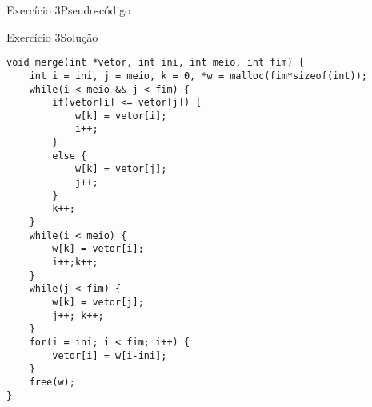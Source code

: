 \documentclass[aspectratio=169]{beamer}
\begin{document}
\begin{frame}{Exercício 3}{Pseudo-código}
\end{frame}


\begin{frame}[fragile]{Exercício 3}{Solução}
\begin{lstlisting}[style=CStyle,basicstyle=\tiny]
void merge(int *vetor, int ini, int meio, int fim) {
    int i = ini, j = meio, k = 0, *w = malloc(fim*sizeof(int));
    while(i < meio && j < fim) {
        if(vetor[i] <= vetor[j]) {
            w[k] = vetor[i];
            i++;
        }
        else {
            w[k] = vetor[j];
            j++;
        }
        k++;
    }
    while(i < meio) {
        w[k] = vetor[i];
        i++;k++;
    }
    while(j < fim) {
        w[k] = vetor[j];
        j++; k++;
    }
    for(i = ini; i < fim; i++) {
        vetor[i] = w[i-ini];
    }
    free(w);
}
\end{lstlisting}  
\end{frame}

\end{document}
